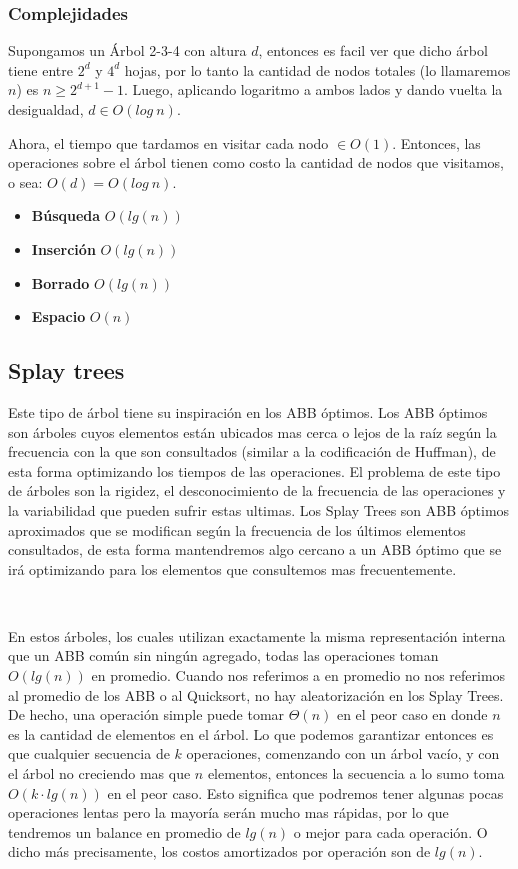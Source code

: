 \subsubsection{Complejidades}

Supongamos un \'Arbol 2-3-4 con altura $d$, entonces es facil ver que dicho \'arbol tiene entre $2^d$ y $4^d$ hojas, por lo tanto la cantidad de nodos totales (lo llamaremos $n$) es $n \geq 2^{d+1} -1$.
Luego, aplicando logaritmo a ambos lados y dando vuelta la desigualdad, $d \in O(log\ n)$.

Ahora, el tiempo que tardamos en visitar cada nodo $\in O(1)$. Entonces, las operaciones sobre el \'arbol tienen como costo la cantidad de nodos que visitamos, o sea: $O(d) = O(log\ n)$.

\begin{itemize}
 \item \textbf{B\'usqueda} $O(lg(n))$
 \item \textbf{Inserci\'on} $O(lg(n))$
 \item \textbf{Borrado} $O(lg(n))$
 \item \textbf{Espacio} $O(n)$
\end{itemize}

\subsection{Splay trees}

Este tipo de \'arbol tiene su inspiraci\'on en los ABB \'optimos. Los ABB \'optimos son \'arboles cuyos elementos est\'an ubicados mas cerca o lejos de la ra\'iz seg\'un la frecuencia con la que son consultados (similar a la codificaci\'on de Huffman), de esta forma optimizando los tiempos de las operaciones. El problema de este tipo de \'arboles son la rigidez, el desconocimiento de la frecuencia de las operaciones y la variabilidad que pueden sufrir estas ultimas. Los Splay Trees son ABB \'optimos aproximados que se modifican seg\'un la frecuencia de los \'ultimos elementos consultados, de esta forma mantendremos algo cercano a un ABB \'optimo que se ir\'a optimizando para los elementos que consultemos mas frecuentemente.

~

En estos \'arboles, los cuales utilizan exactamente la misma representaci\'on interna que un ABB com\'un sin ning\'un agregado, todas las operaciones toman $O(lg(n))$ en promedio. Cuando nos referimos a en promedio no nos referimos al promedio de los ABB o al Quicksort, no hay aleatorizaci\'on en los Splay Trees. De hecho, una operaci\'on simple puede tomar $\Theta(n)$ en el peor caso en donde $n$ es la cantidad de elementos en el \'arbol. Lo que podemos garantizar entonces es que cualquier secuencia de $k$ operaciones, comenzando con un \'arbol vac\'io, y con el \'arbol no creciendo mas que $n$ elementos, entonces la secuencia a lo sumo toma $O(k\cdot lg(n))$ en el peor caso. Esto significa que podremos tener algunas pocas operaciones lentas pero la mayor\'ia ser\'an mucho mas r\'apidas, por lo que tendremos un balance en promedio de $lg(n)$ o mejor para cada operaci\'on. O dicho m\'as precisamente, los costos amortizados por operaci\'on son de $lg(n)$.

